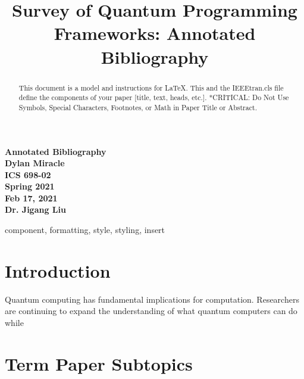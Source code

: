 \documentclass[conference]{IEEEtran}
\begin{document}
\begin{titlepage}
    \begin{center}
        \vspace{4cm}
        \Huge
        \textbf{
            Annotated Bibliography \\
            Dylan Miracle \\
            ICS 698-02 \\
            Spring 2021 \\
            Feb 17, 2021 \\
            Dr. Jigang Liu
        }
    \end{center}
\end{titlepage}
\title{Survey of Quantum Programming Frameworks: Annotated Bibliography}

\author{
}

\maketitle

\begin{abstract}
This document is a model and instructions for \LaTeX.
This and the IEEEtran.cls file define the components of your paper [title, text, heads, etc.]. *CRITICAL: Do Not Use Symbols, Special Characters, Footnotes, 
or Math in Paper Title or Abstract.
\end{abstract}

\begin{IEEEkeywords}
    component, formatting, style, styling, insert
\end{IEEEkeywords}

\section{Introduction}
Quantum computing has fundamental implications for computation. Researchers are continuing to expand the understanding of what quantum computers can do while 

\section{Term Paper Subtopics}
\end{document}

